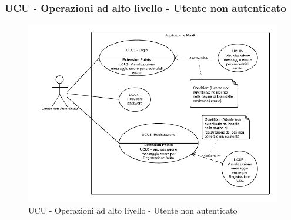 \subsubsection{UCU - Operazioni ad alto livello - Utente non autenticato}    
    \begin{figure}[H]
      \begin{center}
      \includegraphics[scale=0.16]{UML/UCU - Operazioni ad alto livello - Utente non autenticato.png}
      \caption{UCU - Operazioni ad alto livello - Utente non autenticato}
      \end{center} 
    \end{figure}    
    
